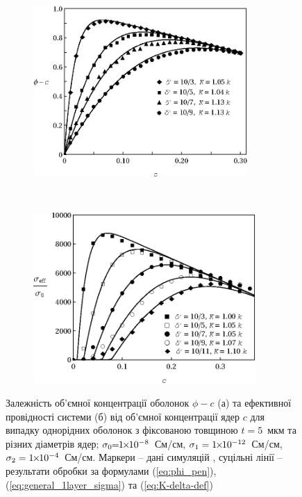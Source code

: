 \documentclass[twoside,a4paper,14pt]{vakaref-utf8}
\begin{document}
\begin{figure}[tb]
	\begin{subfigure}[t]{0.5\textwidth}
		\centering
		\includegraphics[height=65mm]{SiekierskiShell_107_103-9.eps}
		\caption{} \label{fig:simulations-phi-a}
	\end{subfigure}%
	~
	\begin{subfigure}[t]{0.5\textwidth}
		\centering
		\includegraphics[height=65mm]{Fig6_Siekierski_HomogeneousLayers_t_fixed2.eps}
		\caption{} \label{fig:simulations-sigma-1layer2005-a}
	\end{subfigure}
	\caption{\label{fig:simulations-phi} 
		Залежність об'ємної концентрації оболонок $\phi-c$ (а) та ефективної провідності системи (б) від об'ємної концентрації ядер $c$ для випадку однорідних оболонок з фіксованою товщиною $t=5$~мкм та різних діаметрів ядер; $\sigma_0 {\mkern-1mu = \mkern-1mu} 1{\mkern-2mu\times\mkern-2mu} 10^{-8}$~См/см, $\sigma_1 = 1{\mkern-2mu\times\mkern-2mu} 10^{-12}$~См/см, $\sigma_2 = 1{\mkern-2mu\times\mkern-2mu} 10^{-4}$~См/см. Маркери -- дані симуляцій \cite{Siekierski2005, Siekierski2007}, суцільні лінії -- результати обробки за формулами (\ref{eq:phi_pen}), (\ref{eq:general_1layer_sigma}) та (\ref{eq:K-delta-def}) }
\vspace{-10pt}
\end{figure}
\end{document}
